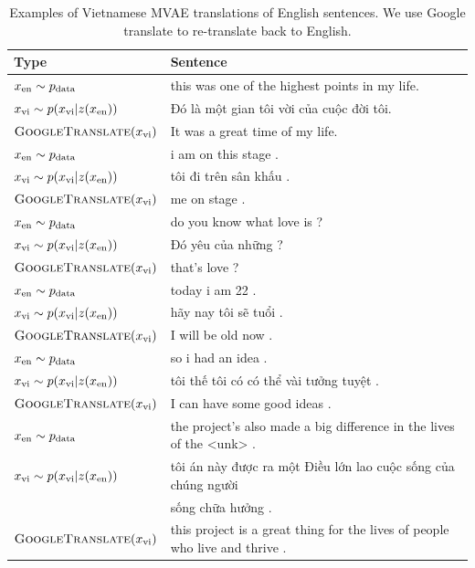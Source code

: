 \begin{table}
\centering
\scriptsize
\begin{tabular}{ l|l }
  \toprule
  \textbf{Type} & \textbf{Sentence} \\
  \hline
  $x_{\textup{en}} \sim p_{\textup{data}}$ & this was one of the highest points in my life. \\
  $x_{\textup{vi}} \sim p(x_{\textup{vi}}|z(x_{\textup{en}}))$ & \foreignlanguage{vietnamese}{Đó là một gian tôi vời của cuộc đời tôi.} \\
  $\textsc{GoogleTranslate}(x_{\textup{vi}})$ & It was a great time of my life. \\
  \hline
  $x_{\textup{en}} \sim p_{\textup{data}}$ & i am on this stage . \\
  $x_{\textup{vi}} \sim p(x_{\textup{vi}}|z(x_{\textup{en}}))$ & \foreignlanguage{vietnamese}{tôi đi trên sân khấu .} \\
  $\textsc{GoogleTranslate}(x_{\textup{vi}})$ & me on stage .\\
  \hline
  $x_{\textup{en}} \sim p_{\textup{data}}$ & do you know what love is ? \\
  $x_{\textup{vi}} \sim p(x_{\textup{vi}}|z(x_{\textup{en}}))$ & \foreignlanguage{vietnamese}{Đó yêu của những ?} \\
  $\textsc{GoogleTranslate}(x_{\textup{vi}})$ & that's love ?\\
  \hline
  $x_{\textup{en}} \sim p_{\textup{data}}$ & today i am 22 . \\
  $x_{\textup{vi}} \sim p(x_{\textup{vi}}|z(x_{\textup{en}}))$ & \foreignlanguage{vietnamese}{hãy nay tôi sẽ tuổi .} \\
  $\textsc{GoogleTranslate}(x_{\textup{vi}})$ & I will be old now . \\
  \hline
  $x_{\textup{en}} \sim p_{\textup{data}}$ & so i had an idea . \\
  $x_{\textup{vi}} \sim p(x_{\textup{vi}}|z(x_{\textup{en}}))$ & \foreignlanguage{vietnamese}{tôi thế tôi có có thể vài tưởng tuyệt .} \\
  $\textsc{GoogleTranslate}(x_{\textup{vi}})$ & I can have some good ideas . \\
  \hline
  $x_{\textup{en}} \sim p_{\textup{data}}$ & the project's also made a big difference in the lives of the <unk> . \\
  $x_{\textup{vi}} \sim p(x_{\textup{vi}}|z(x_{\textup{en}}))$ & \foreignlanguage{vietnamese}{tôi án này được ra một Điều lớn lao cuộc sống của chúng người} \\
  & \foreignlanguage{vietnamese}{sống chữa hưởng .} \\
  $\textsc{GoogleTranslate}(x_{\textup{vi}})$ & this project is a great thing for the lives of people who live and thrive . \\
  \bottomrule
\end{tabular}
\caption{Examples of Vietnamese MVAE translations of English sentences. We use Google translate to re-translate back to English.}
\end{table}

